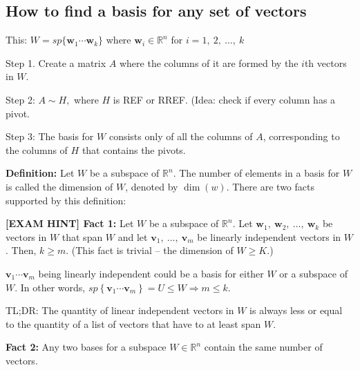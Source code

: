 \documentclass[12pt]{article}
\theoremstyle{plain}
\theoremstyle{remark}
\theoremstyle{definition}
\begin{document}
\subsection{How to find a basis for any set of
vectors}

This: \(W = sp\{{\mathbf{w}}_{1}\cdots{\mathbf{w}}_{k}\}\) where
\({\mathbf{w}}_{i} \in \mathbb{R}^{n}\) for
\(i = 1,\ 2,\ \ldots,\ k\)

Step 1. Create a matrix \(A\) where the columns of it are formed by the
\(i\)th vectors in \(W\).

Step 2: \(A\sim H,\) where \(H\) is REF or RREF. (Idea: check if every
column has a pivot.

Step 3: The basis for \(W\) consists only of all the columns of \(A\),
corresponding to the columns of \(H\) that contains the pivots.

\textbf{Definition:} Let \(W\) be a subspace of \(\mathbb{R}^{n}\). The
number of elements in a basis for \(W\) is called the dimension of
\(W\), denoted by \(\dim(w)\). There are two facts supported by this
definition:

\textbf{{[}EXAM HINT{]} Fact 1:} Let \(W\) be a subspace of
\(\mathbb{R}^{n}\). Let
\({\mathbf{w}}_{1},\ {\mathbf{w}}_{2},\ \ldots,\ {\mathbf{w}}_{k}\)
be vectors in \(W\) that span \(W\) and let
\({\mathbf{v}}_{1},\ \ldots,\ {\mathbf{v}}_{m}\) be linearly
independent vectors in \(W\). Then, \(k \geq m\). (This fact is trivial
-- the dimension of \(W \geq K\).)

\({\mathbf{v}}_{1}\cdots{\mathbf{v}}_{m}\) being linearly
independent could be a basis for either \(W\) or a subspace of \(W\). In
other words,
\(sp\left\{ {\mathbf{v}}_{1}\cdots{\mathbf{v}}_{m} \right\} = U \leq W \Rightarrow m \leq k\).

TL;DR: The quantity of linear independent vectors in \(W\) is always
less or equal to the quantity of a list of vectors that have to at least
span \(W\).

\textbf{Fact 2:} Any two bases for a subspace \(W \in \mathbb{R}^{n}\)
contain the same number of vectors.
\end{document}
